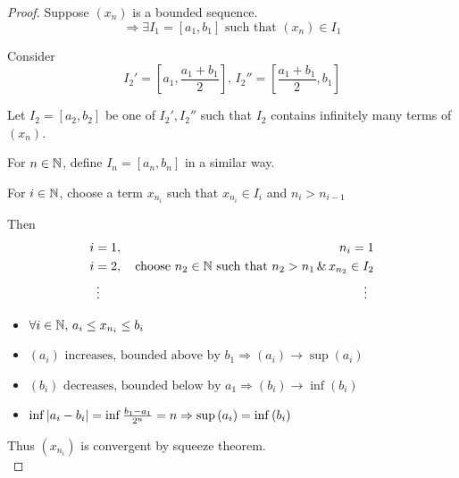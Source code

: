 \documentclass[a4paper,12pt]{article}
\begin{document}
\begin{theorem}
\begin{proof}

        Suppose \((x_n)\) is a bounded sequence.
        \[\Rightarrow \exists I_1=[a_1,b_1] \text{ such that }(x_n)\in I_1\]
        
        Consider \[I_2' = [a_1,\frac{a_1+b_1}{2}], \, I_2'' = [\frac{a_1+b_1}{2}, b_1]\]
        
        Let \(I_2 = [a_2,b_2]\) be one of \(I_2',I_2''\) such that \(I_2\) contains infinitely many terms of \((x_n)\).
        
        For \(n\in\mathbb{N}\), define \(I_n = [a_n,b_n]\) in a similar way.

        For \(i\in\mathbb{N}\), choose a term \(x_{n_i}\) such that \(x_{n_i}\in I_i\) and \(n_i>n_{i-1}\)

        Then \begin{align*}
            & i = 1,\, & n_i = 1\\
            & i = 2,\, & \text{choose }n_2\in\N \text{ such that } n_2>n_1 \,\& \,x_{n_2}\in I_2\\
            & \vdotswithin{=}\notag & \vdotswithin{=}\notag
        \end{align*}

        \begin{itemize}
            \item \(\forall i \in\mathbb{N},\,a_i\le x_{n_i}\le b_i\)
            \item \((a_i) \text{ increases, bounded above by }b_1\Rightarrow (a_i)\rightarrow\sup{(a_i)}\)
            \item \((b_i) \text{ decreases, bounded below by }a_1\Rightarrow (b_i)\rightarrow \inf{(b_i)}\)
            \item \(\inf{\left\lvert a_i-b_i\right\rvert} = \inf{\frac{b_1-a_1}{2^n}} = n \Rightarrow \sup{(a_i)} = \inf{(b_i)}\)
        \end{itemize}

        Thus \((x_{n_i})\) is convergent by squeeze theorem.\\
    \end{proof}
\end{theorem}
\end{document}
